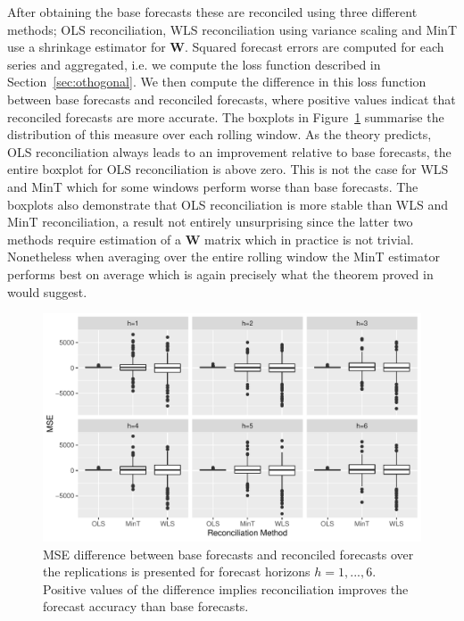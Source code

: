 \documentclass[12pt]{article}
\theoremstyle{definition}
\theoremstyle{property}
\begin{document}
    After obtaining the base forecasts these are reconciled using three different methods; OLS reconciliation, WLS reconciliation using variance scaling and MinT use a shrinkage estimator for ${\bm W}$.  Squared forecast errors are computed for each series and aggregated, i.e. we compute the loss function described in Section~\ref{sec:othogonal}.  We then compute the difference in this loss function between base forecasts and reconciled forecasts, where positive values indicat that reconciled forecasts are more accurate. The boxplots in Figure~\ref{fig:BaseVSRecon_Fc} summarise the distribution of this measure over each rolling window.  As the theory predicts, OLS reconciliation always leads to an improvement relative to base forecasts, the entire boxplot for OLS reconciliation is above zero.  This is not the case for WLS and MinT which for some windows perform worse than base forecasts.  The boxplots also demonstrate that OLS reconciliation is more stable than WLS and MinT reconciliation, a result not entirely unsurprising since the latter two methods require estimation of a ${\bm W}$ matrix which in practice is not trivial.  Nonetheless when averaging over the entire rolling window the MinT estimator performs best on average which is again precisely what the theorem proved in \cite{WicEtAl2019} would suggest.
    
    \begin{figure}[H]
    	\centering
    	\small
    	\includegraphics[width = \textwidth]{Figs/OrthVsOblq_Proj_Emp_results.pdf}
    	\caption{MSE difference between base forecasts and reconciled forecasts over the replications is presented for forecast horizons $h = 1,...,6$. Positive values of the difference implies reconciliation improves the forecast accuracy than base forecasts.}\label{fig:BaseVSRecon_Fc}
    \end{figure}
         
\end{document}
